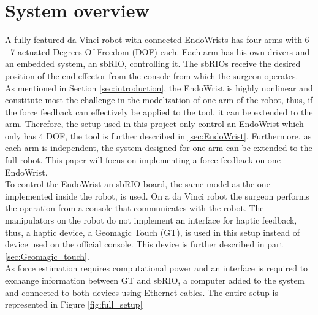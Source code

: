 \section{System overview}\label{sec:system_overview}
{\color{green}
A fully featured da Vinci robot with connected EndoWrists has four arms with 6 - 7 actuated Degrees Of Freedom (DOF) each. Each arm has his own drivers and an embedded system, an sbRIO, controlling it. The sbRIOs receive the desired position of the end-effector from the console from which the surgeon operates.\\
As mentioned in Section \ref{sec:introduction}, the EndoWrist is highly nonlinear and constitute most the challenge in the modelization of one arm of the robot, thus, if the force feedback can effectively be applied to the tool, it can be extended to the arm. Therefore, the setup used in this project only control an EndoWrist which only has 4 DOF, the tool is further described in \ref{sec:EndoWrist}. Furthermore, as each arm is independent, the system designed for one arm can be extended to the full robot. This paper will focus on implementing a force feedback on one EndoWrist. \\ 
To control the EndoWrist an sbRIO board, the same model as the one implemented inside the robot, is used. On a da Vinci robot the surgeon performs the operation from a console that communicates with the robot. The manipulators on the robot do not implement an interface for haptic feedback, thus, a haptic device, a Geomagic Touch (GT), is used in this setup instead of device used on the official console. This device is further described in part \ref{sec:Geomagic_touch}.\\
As force estimation requires computational power and an interface is required to exchange information between GT and sbRIO, a computer added to the system and connected to both devices using Ethernet cables. The entire setup is represented in Figure \ref{fig:full_setup}
\begin{figure}[h]
\centering
{}
\end{figure}}
